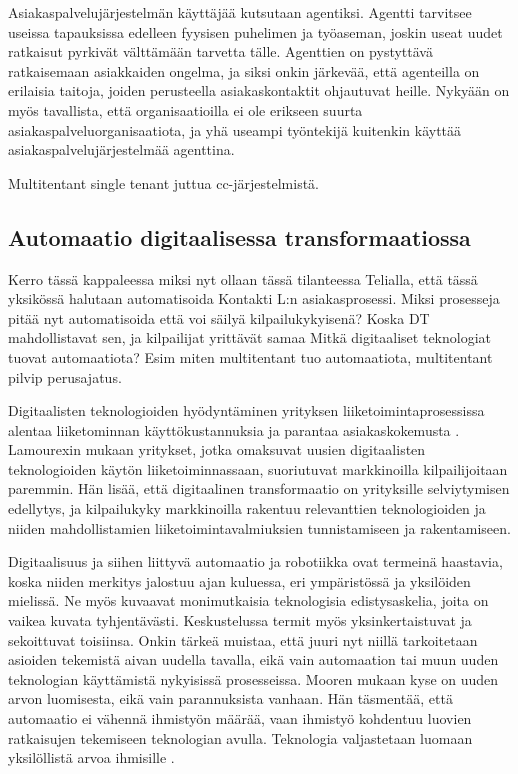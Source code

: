 \documentclass[finnish,12pt,a4paper,pdftex]{article}
\begin{document}
Asiakaspalvelujärjestelmän käyttäjää kutsutaan agentiksi. Agentti tarvitsee useissa tapauksissa edelleen fyysisen puhelimen ja työaseman, joskin useat uudet ratkaisut pyrkivät välttämään tarvetta tälle. Agenttien on pystyttävä ratkaisemaan asiakkaiden ongelma, ja siksi onkin järkevää, että agenteilla on erilaisia taitoja, joiden perusteella asiakaskontaktit ohjautuvat heille. Nykyään on myös tavallista, että organisaatioilla ei ole erikseen suurta asiakaspalveluorganisaatiota, ja yhä useampi työntekijä kuitenkin käyttää asiakaspalvelujärjestelmää agenttina. 

Multitentant single tenant juttua cc-järjestelmistä.

\subsection{Automaatio digitaalisessa transformaatiossa}
Kerro tässä kappaleessa miksi nyt ollaan tässä tilanteessa Telialla, että tässä yksikössä halutaan automatisoida Kontakti L:n asiakasprosessi. Miksi prosesseja pitää nyt automatisoida että voi säilyä kilpailukykyisenä? Koska DT mahdollistavat sen, ja kilpailijat yrittävät samaa
Mitkä digitaaliset teknologiat tuovat automaatiota? Esim miten multitentant tuo automaatiota, multitentant pilvip perusajatus.

Digitaalisten teknologioiden hyödyntäminen yrityksen liiketoimintaprosessissa alentaa liiketominnan käyttökustannuksia ja parantaa asiakaskokemusta  \citep{lamoureux, jungner}. Lamourexin mukaan yritykset, jotka omaksuvat uusien digitaalisten teknologioiden käytön liiketoiminnassaan, suoriutuvat markkinoilla kilpailijoitaan paremmin. Hän lisää, että digitaalinen transformaatio on yrityksille selviytymisen edellytys, ja kilpailukyky markkinoilla rakentuu relevanttien teknologioiden ja niiden mahdollistamien liiketoimintavalmiuksien tunnistamiseen ja rakentamiseen. 

Digitaalisuus ja siihen liittyvä automaatio ja robotiikka ovat termeinä haastavia, koska niiden merkitys jalostuu ajan kuluessa, eri ympäristössä ja yksilöiden mielissä. Ne myös kuvaavat monimutkaisia teknologisia edistysaskelia, joita on vaikea kuvata tyhjentävästi. Keskustelussa termit myös yksinkertaistuvat ja sekoittuvat toisiinsa. Onkin tärkeä muistaa, että juuri nyt niillä tarkoitetaan asioiden tekemistä aivan uudella tavalla, eikä vain automaation tai muun uuden teknologian käyttämistä nykyisissä prosesseissa. Mooren \citeyearpar{susanmoore} mukaan kyse on uuden arvon luomisesta, eikä vain parannuksista vanhaan. Hän täsmentää, että automaatio ei vähennä ihmistyön määrää, vaan ihmistyö kohdentuu luovien ratkaisujen tekemiseen teknologian avulla. Teknologia valjastetaan luomaan yksilöllistä arvoa ihmisille \citep{jungner, susanmoore}.
\end{document}
